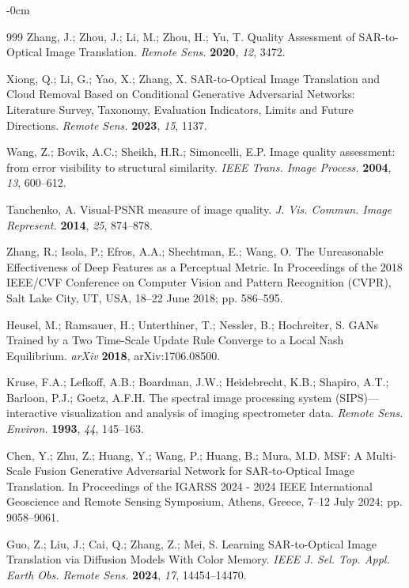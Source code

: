 \documentclass[remotesensing,article,submit,pdftex,moreauthors]{Definitions/mdpi}
\begin{document}
\begin{adjustwidth}{-\extralength}{0cm}
\begin{thebibliography}{999}
Zhang, J.; Zhou, J.; Li, M.; Zhou, H.; Yu, T. Quality Assessment of SAR-to-Optical Image Translation. {\em Remote Sens.} {\bf 2020}, {\em 12}, 3472.

Xiong, Q.; Li, G.; Yao, X.; Zhang, X. SAR-to-Optical Image Translation and Cloud Removal Based on Conditional Generative Adversarial Networks: Literature Survey, Taxonomy, Evaluation Indicators, Limits and Future Directions. {\em Remote Sens.} {\bf 2023}, {\em 15}, 1137.

Wang, Z.; Bovik, A.C.; Sheikh, H.R.; Simoncelli, E.P. Image quality assessment: from error visibility to structural similarity. {\em IEEE Trans. Image Process.} {\bf 2004}, {\em 13}, 600--612.

Tanchenko, A. Visual-PSNR measure of image quality. {\em J. Vis. Commun. Image Represent.} {\bf 2014}, {\em 25}, 874--878.

Zhang, R.; Isola, P.; Efros, A.A.; Shechtman, E.; Wang, O. The Unreasonable Effectiveness of Deep Features as a Perceptual Metric. In Proceedings of the 2018 IEEE/CVF Conference on Computer Vision and Pattern Recognition (CVPR), Salt Lake City, UT, USA, 18–22 June 2018; pp. 586--595.

Heusel, M.; Ramsauer, H.; Unterthiner, T.; Nessler, B.; Hochreiter, S. GANs Trained by a Two Time-Scale Update Rule Converge to a Local Nash Equilibrium. {\em arXiv} {\bf 2018}, arXiv:1706.08500.

Kruse, F.A.; Lefkoff, A.B.; Boardman, J.W.; Heidebrecht, K.B.; Shapiro, A.T.; Barloon, P.J.; Goetz, A.F.H. The spectral image processing system (SIPS)—interactive visualization and analysis of imaging spectrometer data. {\em Remote Sens. Environ.} {\bf 1993}, {\em 44}, 145--163.

Chen, Y.; Zhu, Z.; Huang, Y.; Wang, P.; Huang, B.; Mura, M.D. MSF: A Multi-Scale Fusion Generative Adversarial Network for SAR-to-Optical Image Translation. In Proceedings of the IGARSS 2024 - 2024 IEEE International Geoscience and Remote Sensing Symposium, Athens, Greece, 7–12 July 2024; pp. 9058--9061.

Guo, Z.; Liu, J.; Cai, Q.; Zhang, Z.; Mei, S. Learning SAR-to-Optical Image Translation via Diffusion Models With Color Memory. {\em IEEE J. Sel. Top. Appl. Earth Obs. Remote Sens.} {\bf 2024}, {\em 17}, 14454--14470.


\end{thebibliography}
\end{adjustwidth}
\end{document}
